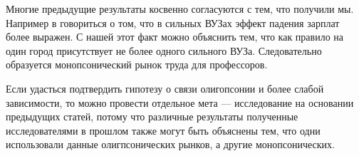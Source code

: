 \documentclass[a4paper, 12pt]{article}
\theoremstyle{definition}
\theoremstyle{plain}
\begin{document}
Многие предыдущие результаты косвенно согласуются с тем, что получили мы. Например в \cite{1} говориться о том, что в сильных ВУЗах эффект падения зарплат более выражен. С нашей этот факт можно объяснить тем, что как правило на один город присутствует не более одного сильного ВУЗа. Следовательно образуется монопсонический рынок труда для профессоров. 


Если удасться подтвердить гипотезу о связи олигопсонии и более слабой зависимости, то можно провести отдельное мета --- исследование на основании предыдущих статей, потому что различные результаты полученные исследователями в прошлом также могут быть объяснены тем, что одни использовали данные олигпсонических рынков, а другие монопсонических. 

\renewcommand{\refname}{Список литературы}

 
\end{document}
